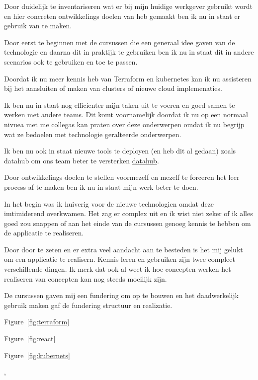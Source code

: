 {{{		}
		{%
			Door duidelijk te inventariseren wat er bij mijn huidige werkgever gebruikt wordt en hier concreten ontwikkelings doelen van heb gemaakt ben ik nu in staat er gebruik van te maken.

			Door eerst te beginnen met de cursussen die een generaal idee gaven van de technologie en daarna dit in praktijk te gebruiken ben ik nu in staat dit in andere scenarios ook te gebruiken en toe te passen.

			Doordat ik nu meer kennis heb van Terraform en kubernetes kan ik nu assisteren bij het aansluiten of maken van clusters of nieuwe cloud implemenaties.

			Ik ben nu in staat nog efficienter mijn taken uit te voeren en goed samen te werken met andere teams.
			Dit komt voornamelijk doordat ik nu op een normaal nivuea met me collegas kan praten over deze onderwerpen omdat ik nu begrijp wat ze bedoelen met technologie geralteerde onderwerpen.

			Ik ben nu ook in staat nieuwe tools te deployen (en heb dit al gedaan) zoals datahub om ons team beter te versterken \href{https://datahubproject.io/}{datahub}.

		}
		{%
			Door ontwikkelings doelen te stellen voormezelf en mezelf te forceren het leer process af te maken ben ik nu in staat mijn werk beter te doen.

			In het begin was ik huiverig voor de nieuwe technologien omdat deze imtimiderend overkwamen.
			Het zag er complex uit en ik wist niet zeker of ik alles goed zou snappen of aan het einde van de cursussen genoeg kennis te hebben om de applicatie te realiseren.

			Door door te zeten en er extra veel aandacht aan te besteden is het mij gelukt om een applicatie te realisern.
			Kennis leren en gebruiken zijn twee compleet verschillende dingen.
			Ik merk dat ook al weet ik hoe concepten werken het realiseren van concepten kan nog steeds moeilijk zijn.

			De cursussen gaven mij een fundering om op te bouwen en het daadwerkelijk gebruik maken gaf de fundering structuur en realizatie.
		}
		{


		}
	}
	{%

		Figure~\ref{fig:terraform}

		Figure~\ref{fig:react}

		Figure~\ref{fig:kubernets}
	},
}
